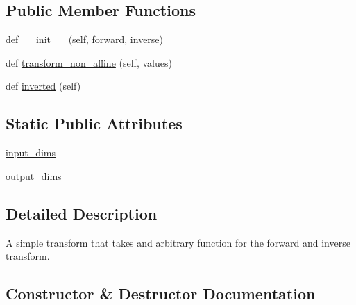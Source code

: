 \subsection*{Public Member Functions}
\begin{DoxyCompactItemize}
\item 
def \hyperlink{classmatplotlib_1_1scale_1_1FuncTransform_af218e5bca8d3a9e6a37af155367192f3}{\+\_\+\+\_\+init\+\_\+\+\_\+} (self, forward, inverse)
\item 
def \hyperlink{classmatplotlib_1_1scale_1_1FuncTransform_ae927de7ab1725cf98fa8e21df13c74b9}{transform\+\_\+non\+\_\+affine} (self, values)
\item 
def \hyperlink{classmatplotlib_1_1scale_1_1FuncTransform_a84aff6aa144ebf8642a34243177b766f}{inverted} (self)
\end{DoxyCompactItemize}
\subsection*{Static Public Attributes}
\begin{DoxyCompactItemize}
\item 
\hyperlink{classmatplotlib_1_1scale_1_1FuncTransform_ad8d6cd365042d469e74937caaba2c1e2}{input\+\_\+dims}
\item 
\hyperlink{classmatplotlib_1_1scale_1_1FuncTransform_a6612724ca3327805cb103f4879ca7c3c}{output\+\_\+dims}
\end{DoxyCompactItemize}


\subsection{Detailed Description}
\begin{DoxyVerb}A simple transform that takes and arbitrary function for the
forward and inverse transform.
\end{DoxyVerb}
 

\subsection{Constructor \& Destructor Documentation}
\mbox{\label{classmatplotlib_1_1scale_1_1FuncTransform_af218e5bca8d3a9e6a37af155367192f3}} 
